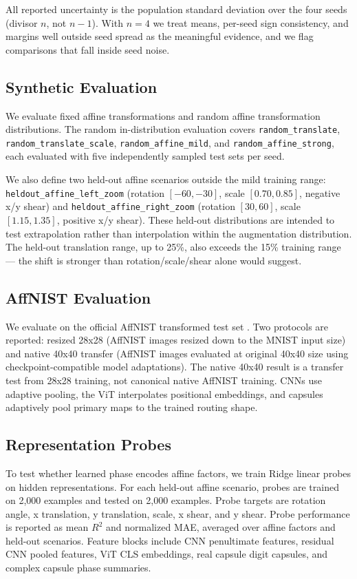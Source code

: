 \documentclass[11pt]{article}
\begin{document}
All reported uncertainty is the population standard deviation over the four seeds (divisor $n$, not $n-1$). With $n = 4$ we treat means, per-seed sign consistency, and margins well outside seed spread as the meaningful evidence, and we flag comparisons that fall inside seed noise.

\subsection{Synthetic Evaluation}
We evaluate fixed affine transformations and random affine transformation distributions. The random in-distribution evaluation covers \texttt{random\_translate}, \texttt{random\_translate\_scale}, \texttt{random\_affine\_mild}, and \texttt{random\_affine\_strong}, each evaluated with five independently sampled test sets per seed.

We also define two held-out affine scenarios outside the mild training range: \texttt{heldout\_affine\_left\_zoom} (rotation $[-60, -30]$, scale $[0.70, 0.85]$, negative x/y shear) and \texttt{heldout\_affine\_right\_zoom} (rotation $[30, 60]$, scale $[1.15, 1.35]$, positive x/y shear). These held-out distributions are intended to test extrapolation rather than interpolation within the augmentation distribution. The held-out translation range, up to 25\%, also exceeds the 15\% training range --- the shift is stronger than rotation/scale/shear alone would suggest.

\subsection{AffNIST Evaluation}
We evaluate on the official AffNIST transformed test set \citep{affnist}. Two protocols are reported: resized 28x28 (AffNIST images resized down to the MNIST input size) and native 40x40 transfer (AffNIST images evaluated at original 40x40 size using checkpoint-compatible model adaptations). The native 40x40 result is a transfer test from 28x28 training, not canonical native AffNIST training. CNNs use adaptive pooling, the ViT interpolates positional embeddings, and capsules adaptively pool primary maps to the trained routing shape.

\subsection{Representation Probes}
To test whether learned phase encodes affine factors, we train Ridge linear probes on hidden representations. For each held-out affine scenario, probes are trained on 2,000 examples and tested on 2,000 examples. Probe targets are rotation angle, x translation, y translation, scale, x shear, and y shear. Probe performance is reported as mean $R^2$ and normalized MAE, averaged over affine factors and held-out scenarios. Feature blocks include CNN penultimate features, residual CNN pooled features, ViT CLS embeddings, real capsule digit capsules, and complex capsule phase summaries.
\end{document}
